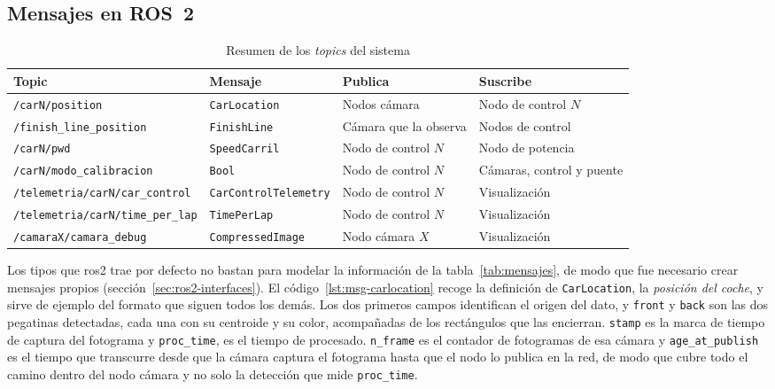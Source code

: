 \subsection{Mensajes en ROS~2}
\label{subsec:mensajes-propios}

\begin{table}[tbp]
	\centering
	\estilotabla
	\begin{tabular}{p{3.5cm}|p{3.3cm}|p{3.0cm}|p{3.2cm}}
		\rowcolor{udcpink!25}
		\textbf{Topic} & \textbf{Mensaje} & \textbf{Publica} & \textbf{Suscribe} \\
		\hline
		\texttt{/carN/position} & \texttt{CarLocation} & Nodos cámara & Nodo de control $N$ \\
		\texttt{/finish\_\allowbreak line\_position} & \texttt{FinishLine} & Cámara que la observa & Nodos de control \\
		\texttt{/carN/pwd} & \texttt{SpeedCarril} & Nodo de control $N$ & Nodo de potencia \\
		\texttt{/carN/\allowbreak modo\_calibracion} & \texttt{Bool} & Nodo de control $N$ & Cámaras, control y puente \\
		\texttt{/telemetria/carN/\allowbreak car\_control} & \texttt{CarControl\allowbreak Telemetry} & Nodo de control $N$ & Visualización \\
		\texttt{/telemetria/carN/\allowbreak time\_per\_lap} & \texttt{TimePerLap} & Nodo de control $N$ & Visualización \\
		\texttt{/camaraX/\allowbreak camara\_debug} & \texttt{CompressedImage} & Nodo cámara $X$ & Visualización \\
	\end{tabular}
	\caption{Resumen de los \emph{topics} del sistema}
	\label{tab:topics-ros2}
\end{table}

Los tipos que \gls{ros2} trae por defecto no bastan para modelar la información de la tabla~\ref{tab:mensajes}, de modo que fue necesario crear mensajes propios (sección~\ref{sec:ros2-interfaces}).
El código~\ref{lst:msg-carlocation} recoge la definición de \texttt{CarLocation}, la \emph{posición del coche}, y sirve de ejemplo del formato que siguen todos los demás. Los dos primeros campos identifican el origen del dato, y \texttt{front} y \texttt{back} son las dos pegatinas detectadas, cada una con su centroide y su color, acompañadas de los rectángulos que las encierran. \texttt{stamp} es la marca de tiempo de captura del fotograma y \texttt{proc\_time}, es el tiempo de procesado. \texttt{n\_frame} es el contador de fotogramas de esa cámara y \texttt{age\_at\_publish} es el tiempo que transcurre desde que la cámara captura el fotograma hasta que el nodo lo publica en la red, de modo que cubre todo el camino dentro del nodo cámara y no solo la detección que mide \texttt{proc\_time}.

